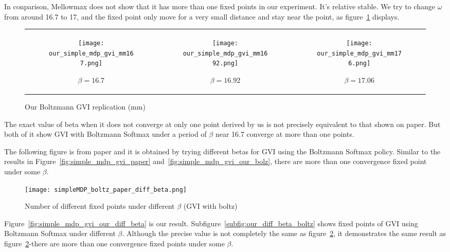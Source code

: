 In conparison, Mellowmax does not show that it has more than one fixed points in our experiment.
It's relative stable. We try to change $\omega$ from around 16.7 to 17, and 
the fixed point only move for a very small distance and stay near the point, as figure\ \ref{fig:simple_mdp_gvi_our_mm} displays.

{\centering
\begin{figure}[H]
\begin{tabular}{ccc}
\begin{subfigure}{0.33\textwidth}\centering\texttt{[image: our\_simple\_mdp\_gvi\_mm167.png]}\caption{$\beta=16.7$}\end{subfigure}&
\begin{subfigure}{0.33\textwidth}\centering\texttt{[image: our\_simple\_mdp\_gvi\_mm1692.png]}\caption{$\beta=16.92$}\end{subfigure}&
\begin{subfigure}{0.33\textwidth}\centering\texttt{[image: our\_simple\_mdp\_gvi\_mm176.png]}\caption{$\beta=17.06$}\end{subfigure}\\
\end{tabular}
\caption{Our Boltzmann GVI replication (mm)}\label{fig:simple_mdp_gvi_our_mm}
\end{figure}}

The exact value of beta when it does not converge at only one point 
derived by us is not precisely equivalent to that shown on paper. 
But both of it show GVI with Boltzmann Softmax under a period of $\beta$ 
near 16.7 converge at more than one points.


The following figure is from paper and it is obtained by trying different betas for GVI using the Boltzmann Softmax policy. 
Similar to the results in Figure\ \ref{fig:simple_mdp_gvi_paper} and\ \ref{fig:simple_mdp_gvi_our_bolz},
there are more than one convergence fixed point under some $\beta$.

\begin{figure}[H]
    \centering
    \texttt{[image: simpleMDP\_boltz\_paper\_diff\_beta.png]}
    \caption{Number of different fixed points under different $\beta$ (GVI with boltz)}\label{fig:simple_mdp_boltz_paper_diff_beta}
\end{figure}

Figure\ \ref{fig:simple_mdp_gvi_our_diff_beta} is our result. 
Subfigure\ \ref{subfig:our_diff_beta_boltz} shows fixed points of GVI using Boltzmann Softmax 
under different $\beta$. Although the precise value is not completely the same as figure\ \ref{fig:simple_mdp_boltz_paper_diff_beta},
it demonstrates the same result as figure\ \ref{fig:simple_mdp_boltz_paper_diff_beta}-there are more than one convergence fixed points under some $\beta$.


